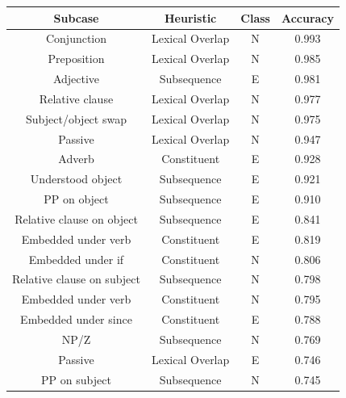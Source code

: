 \documentclass[11pt]{article}
\begin{document}
\begin{table}[]
\centering
\begin{tabular}{cccc}
\toprule
\textbf{Subcase}              & \textbf{Heuristic} & \textbf{Class} & \textbf{Accuracy} \\ \midrule
Conjunction                   & Lexical Overlap    & N              & 0.993             \\
Preposition                   & Lexical Overlap    & N              & 0.985             \\
Adjective                     & Subsequence        & E              & 0.981             \\
Relative   clause             & Lexical Overlap    & N              & 0.977             \\
Subject/object   swap         & Lexical Overlap    & N              & 0.975             \\
Passive                       & Lexical Overlap    & N              & 0.947             \\
Adverb                        & Constituent        & E              & 0.928             \\
Understood   object           & Subsequence        & E              & 0.921             \\
PP on   object                & Subsequence        & E              & 0.910              \\
Relative   clause on object   & Subsequence        & E              & 0.841             \\
Embedded   under verb         & Constituent        & E              & 0.819             \\
Embedded   under if           & Constituent        & N              & 0.806             \\
Relative   clause on subject  & Subsequence        & N              & 0.798             \\
Embedded   under verb         & Constituent        & N              & 0.795             \\
Embedded   under since        & Constituent        & E              & 0.788             \\
NP/Z                          & Subsequence        & N              & 0.769             \\
Passive                       & Lexical Overlap    & E              & 0.746             \\
PP on   subject               & Subsequence        & N              & 0.745             \\

\end{tabular}
\end{table}
\end{document}
